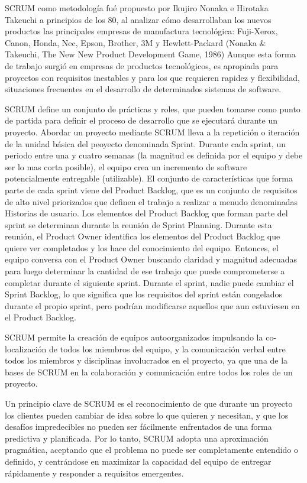 \documentclass[../pfc.tex]{subfiles}
\begin{document}
	SCRUM como metodología fué propuesto por Ikujiro Nonaka e Hirotaka Takeuchi a principios de los 80, al analizar cómo desarrollaban los nuevos productos las principales empresas de manufactura tecnológica: Fuji-Xerox, Canon, Honda, Nec, Epson, Brother, 3M y Hewlett-Packard (Nonaka \& Takeuchi, The New New Product Development Game, 1986)
	Aunque esta forma de trabajo surgió en empresas de productos tecnológicos, es apropiada para proyectos con requisitos inestables y para los que requieren rapidez y flexibilidad, situaciones frecuentes en el desarrollo de determinados sistemas de software.
	
	SCRUM define un conjunto de prácticas y roles, que pueden tomarse como punto de partida para definir el proceso de desarrollo que se ejecutará durante un proyecto. Abordar un proyecto mediante SCRUM lleva a la repetición o iteración de la unidad básica del peoyecto denominada Sprint. Durante cada sprint, un periodo entre una y cuatro semanas (la magnitud es definida por el equipo y debe ser lo mas corta posible), el equipo crea un incremento de software potencialmente entregable (utilizable). El conjunto de características que forma parte de cada sprint viene del Product Backlog, que es un conjunto de requisitos de alto nivel priorizados que definen el trabajo a realizar a menudo denominadas Historias de usuario. Los elementos del Product Backlog que forman parte del sprint se determinan durante la reunión de Sprint Planning. Durante esta reunión, el Product Owner identifica los elementos del Product Backlog que quiere ver completados y los hace del conocimiento del equipo. Entonces, el equipo conversa con el Product Owner buscando claridad y magnitud adecuadas para luego determinar la cantidad de ese trabajo que puede comprometerse a completar durante el siguiente sprint. Durante el sprint, nadie puede cambiar el Sprint Backlog, lo que significa que los requisitos del sprint están congelados durante el propio sprint, pero podrían modificarse aquellos que aun estuviesen en el Product Backlog.
	
	SCRUM permite la creación de equipos autoorganizados impulsando la co-localización de todos los miembros del equipo, y la comunicación verbal entre todos los miembros y disciplinas involucrados en el proyecto, ya que una de la bases de SCRUM en la colaboración y comunicación entre todos los roles de un proyecto. 
	
	Un principio clave de SCRUM es el reconocimiento de que durante un proyecto los clientes pueden cambiar de idea sobre lo que quieren y necesitan, y que los desafíos impredecibles no pueden ser fácilmente enfrentados de una forma predictiva y planificada. Por lo tanto, SCRUM adopta una aproximación pragmática, aceptando que el problema no puede ser completamente entendido o definido, y centrándose en maximizar la capacidad del equipo de entregar rápidamente y responder a requisitos emergentes.
	
\end{document}
